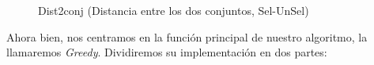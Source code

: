 \begin{figure}[H]
	\centering
	\begin{minipage}{.9\linewidth}
		
		

\begin{algorithm}[H] 

	\caption{Dist2conj (Distancia entre los dos conjuntos, Sel-UnSel)}
	\SetAlgoLined
	
	
	
	
\end{algorithm} 




\end{minipage}
\end{figure}

\hfill


Ahora bien, nos centramos en la función principal de nuestro algoritmo, la llamaremos \textit{Greedy}. 
Dividiremos su implementación en dos partes:

